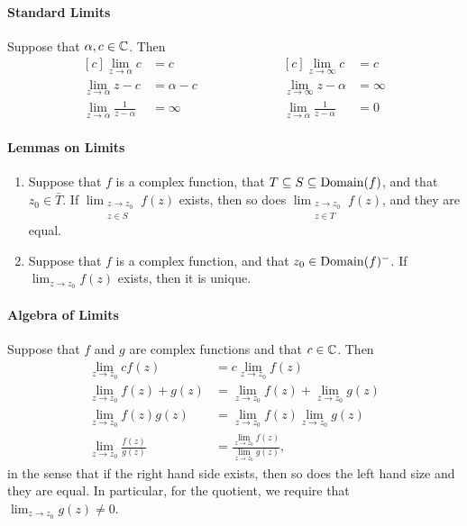 \paragraph{Standard Limits}
Suppose that \(\alpha, c \in \mathbb{C}\). Then
\[
    \begin{aligned}[c]
        \lim_{z \to \alpha} c & = c \\
        \lim_{z \to \alpha} z - c & = \alpha - c \\
        \lim_{z \to \alpha} \frac{1}{z - \alpha} & = \infty
    \end{aligned}
    \qquad \qquad \qquad
    \begin{aligned}[c]
        \lim_{z \to \infty} c & = c \\
        \lim_{z \to \infty} z - \alpha & = \infty \\
        \lim_{z \to \alpha} \frac{1}{z - \alpha} & = 0
    \end{aligned}
\]

\paragraph{Lemmas on Limits}
\begin{enumerate}
    \item Suppose that \(f\) is a complex function, that \(T \subseteq S \subseteq \mathrm{Domain}(f)\), and that \(z_0 \in \bar{T}\). If \(\lim_{\substack{z \to z_0 \\ z \in S}} f(z)\) exists, then so does \(\lim_{\substack{z \to z_0 \\ z \in T}} f(z)\), and they are equal.
    \item Suppose that \(f\) is a complex function, and that \(z_0 \in \mathrm{Domain}(f)^-\). If \(\lim_{z \to z_0}f(z)\) exists, then it is unique.
\end{enumerate}

\paragraph{Algebra of Limits}
Suppose that \(f\) and \(g\) are complex functions and that \(c \in \mathbb{C}\). Then
\begin{align*}
    \lim_{z \to z_0} cf(z) & = c \lim_{z \to z_0} f(z) \\
    \lim_{z \to z_0} f(z) + g(z) & = \lim_{z \to z_0} f(z) + \lim_{z \to z_0} g(z) \\
    \lim_{z \to z_0} f(z) g(z) & = \lim_{z \to z_0} f(z) \lim_{z \to z_0} g(z) \\
    \lim_{z \to z_0} \frac{f(z)}{g(z)} & = \frac{\lim_{z \to z_0} f(z)}{\lim_{z \to z_0} g(z)},
\end{align*}
in the sense that if the right hand side exists, then so does the left hand size and they are equal. In particular, for the quotient, we require that \(\lim_{z \to z_0} g(z) \neq 0\).

